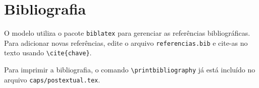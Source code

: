 \section{Bibliografia}

O modelo utiliza o pacote \texttt{biblatex} para gerenciar as referências bibliográficas. Para adicionar novas referências, edite o arquivo \texttt{referencias.bib} e cite-as no texto usando \verb|\cite{chave}|.

Para imprimir a bibliografia, o comando \verb|\printbibliography| já está incluído no arquivo \texttt{caps/postextual.tex}.
